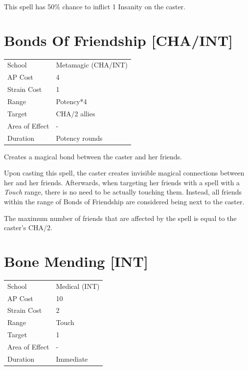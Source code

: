 \documentclass[11pt,a4paper,twocolumn]{book}
\begin{document}
This spell has 50\% chance to inflict 1 Insanity on the caster.


\section*{Bonds Of Friendship [CHA/INT]}

{
	\begin{tabu} to 75mm{| X[l,4] | X[l,7] |}
		\hline
		School 			& Metamagic (CHA/INT) 	\\
        AP Cost	      	& 4 					\\
        Strain Cost     & 1 					\\
        Range     		& Potency*4 			\\
        Target      	& CHA/2 allies			\\
        Area of Effect  & - 	 				\\
        Duration     	& Potency rounds 		\\ \hline
	\end{tabu}
		
}

\medskip

Creates a magical bond between the caster and her friends.

Upon casting this spell, the caster creates invisible magical connections between her and her friends. Afterwards, when targeting her friends with a spell with a \textit{Touch} range, there is no need to be actually touching them. Instead, all friends within the range of Bonds of Friendship are considered being next to the caster.

The maximum number of friends that are affected by the spell is equal to the caster's CHA/2.


\section*{Bone Mending [INT]}
{
	\begin{tabu} to 75mm{| X[l,4] | X[l,7] |}
		\hline
		School 			& Medical (INT) 		\\
        AP Cost	      	& 10 					\\
        Strain Cost     & 2 					\\
        Range     		& Touch 				\\
        Target      	& 1 					\\
        Area of Effect  & - 	 				\\
        Duration     	& Immediate 			\\ \hline
	\end{tabu}
		
}
\end{document}
